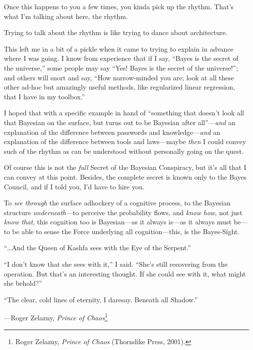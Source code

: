 {
 Once this happens to you a few times, you kinda pick up the
rhythm. That's what I'm talking about
here, the rhythm.}

{
 Trying to talk about the rhythm is like trying to dance about
architecture.}

{
 This left me in a bit of a pickle when it came to trying to
explain in advance where I was going. I know from experience that if I
say, ``Bayes is the secret of the
universe,'' some people may say
``Yes! Bayes is the secret of the
universe!''; and others will snort and say,
``How narrow-minded you are; look at all these other
ad-hoc but amazingly useful methods, like regularized linear
regression, that I have in my toolbox.''}

{
 I hoped that with a specific example in hand of
``something that doesn't look all that
Bayesian on the surface, but turns out to be Bayesian after
all''---\textit{and} an explanation of the difference
between passwords and knowledge---\textit{and} an explanation of the
difference between tools and laws---maybe \textit{then} I could convey
such of the rhythm as can be understood without personally going on the
quest.}

{
 Of course this is not the \textit{full} Secret of the Bayesian
Conspiracy, but it's all that I can convey at this
point. Besides, the complete secret is known only to the Bayes Council,
and if I told you, I'd have to hire you.}

{
 To \textit{see through} the surface adhockery of a cognitive
process, to the Bayesian structure \textit{underneath}{}---to perceive
the probability flows, and \textit{know how}, not just \textit{know
that}, this cognition too is Bayesian---as it always is---as it always
must be---to be able to sense the Force underlying all
cognition---this, is the Bayes-Sight.}

{
 ``\ldots And the Queen of Kashfa sees with the Eye
of the Serpent.''}

{
 ``I don't know that she sees with
it,'' I said.
``She's still recovering from the
operation. But that's an interesting thought. If she
could see with it, what might she behold?''}

{
 ``The clear, cold lines of eternity, I daresay.
Beneath all Shadow.''}

{\raggedleft
 {}---Roger Zelazny, \textit{Prince of Chaos}\footnote{Roger Zelazny, \textit{Prince of Chaos} (Thorndike Press,
2001).}
\par}


\bigskip

